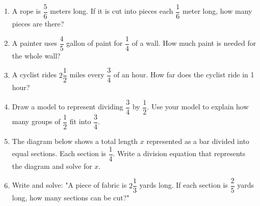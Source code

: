 \documentclass[12pt]{article}
\begin{document}
\begin{tcolorbox}[colframe=black!60, colback=white, 
coltitle=black, colbacktitle=black!15, fonttitle=\bfseries\Large, 
title=Problems, halign title=center, left=10pt, right=10pt, top=10pt, bottom=80pt]
\begin{enumerate}[start=9, itemsep=5em]
    \item A rope is \( \dfrac{5}{6} \) meters long. If it is cut into pieces each \( \dfrac{1}{6} \) meter long, how many pieces are there?
    \item A painter uses \( \dfrac{4}{5} \) gallon of paint for \( \dfrac{1}{4} \) of a wall. How much paint is needed for the whole wall?
    \item A cyclist rides \( 2 \dfrac{1}{2} \) miles every \( \dfrac{3}{4} \) of an hour. How far does the cyclist ride in 1 hour?
  
    \item Draw a model to represent dividing \( \dfrac{3}{4} \) by \( \dfrac{1}{2} \). Use your model to explain how many groups of \( \dfrac{1}{2} \) fit into \( \dfrac{3}{4} \).
\item The diagram below shows a total length \( x \) represented as a bar divided into equal sections. Each section is \( \dfrac{1}{4} \). Write a division equation that represents the diagram and solve for \( x \).

\begin{center}
\end{center}





    \item Write and solve: "A piece of fabric is \( 2 \dfrac{1}{3} \) yards long. If each section is \( \dfrac{2}{5} \) yards long, how many sections can be cut?"
\end{enumerate}
\end{tcolorbox}
\end{document}
